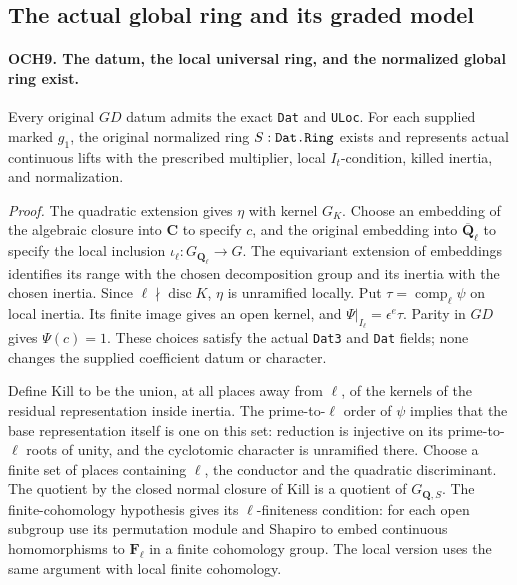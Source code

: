 \documentclass[11pt,a4paper]{article}
\numberwithin{equation}{section}
\theoremstyle{remark}\newtheorem{remark}[theorem]{Remark}
\begin{document}
\subsection{The actual global ring and its graded model}

\paragraph{OCH9. The datum, the local universal ring, and the normalized global ring exist.}
\label{claim:OCH9}
Every original \(GD\) datum admits the exact \texttt{Dat} and
\texttt{ULoc}.  For each supplied marked \(g_1\), the original
normalized ring \(S:\texttt{Dat.\allowbreak Ring}\) exists and represents
actual continuous lifts with the prescribed multiplier, local
\(I_t\)-condition, killed inertia, and normalization.

\emph{Proof.}
The quadratic extension gives \(\eta\) with kernel \(G_K\).
Choose an embedding of the algebraic closure into \(\mathbf C\)
to specify \(c\), and the original embedding into
\(\overline{\mathbf Q}_\ell\) to specify the local inclusion
\(\iota_\ell:G_{\mathbf Q_\ell}\to G\).  The equivariant
extension of embeddings identifies its range with the chosen
 decomposition group and its inertia with the chosen inertia.
Since \(\ell\nmid\operatorname{disc}K\), \(\eta\) is
unramified locally.  Put \(\tau=\operatorname{comp}_\ell\psi\)
on local inertia.  Its finite image gives an open kernel, and
\(\Psi|_{I_\ell}=\epsilon^e\tau\).  Parity in \(GD\)
gives \(\Psi(c)=1\).  These choices satisfy the actual
\texttt{Dat3} and \texttt{Dat} fields; none changes the supplied
coefficient datum or character.

Define \(\mathrm{Kill}\) to be the union, at all places away
from \(\ell\), of the kernels of the residual representation
inside inertia.  The prime-to-\(\ell\) order of \(\psi\)
implies that the base representation itself is one on this set:
reduction is injective on its prime-to-\(\ell\) roots of unity,
and the cyclotomic character is unramified there.  Choose a finite
set of places containing \(\ell\), the conductor and the
quadratic discriminant.  The quotient by the closed normal closure
of \(\mathrm{Kill}\) is a quotient of \(G_{\mathbf Q,S}\).
The finite-cohomology hypothesis gives its \(\ell\)-finiteness
condition: for each open subgroup use its permutation module and
Shapiro to embed continuous homomorphisms to \(\mathbf F_\ell\)
in a finite cohomology group.  The local version uses the same
argument with local finite cohomology.
\end{document}
